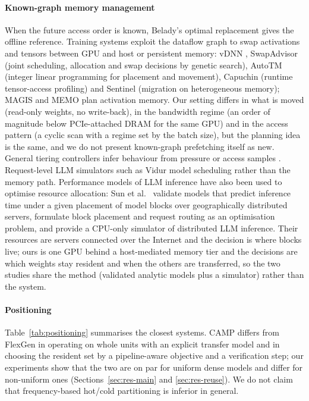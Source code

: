 \documentclass[preprint,12pt]{elsarticle}
\newcommand{\camp}{\textsc{CAMP}}
\begin{document}
\paragraph{Known-graph memory management}
When the future access order is known, Belady's optimal replacement \cite{belady1966study} gives the offline reference. Training systems exploit the dataflow graph to swap activations and tensors between GPU and host or persistent memory: vDNN \cite{rhu2016vdnn}, SwapAdvisor \cite{huang2020swapadvisor} (joint scheduling, allocation and swap decisions by genetic search), AutoTM \cite{hildebrand2020autotm} (integer linear programming for placement and movement), Capuchin \cite{peng2020capuchin} (runtime tensor-access profiling) and Sentinel \cite{ren2021sentinel} (migration on heterogeneous memory); MAGIS and MEMO \cite{chen2024magis,zhao2025memo} plan activation memory. Our setting differs in what is moved (read-only weights, no write-back), in the bandwidth regime (an order of magnitude below PCIe-attached DRAM for the same GPU) and in the access pattern (a cyclic scan with a regime set by the batch size), but the planning idea is the same, and we do not present known-graph prefetching itself as new. General tiering controllers infer behaviour from pressure or access samples \cite{tmo,limoncello}. Request-level LLM simulators such as Vidur \cite{agrawal2024vidur} model scheduling rather than the memory path. Performance models of LLM inference have also been used to optimise resource allocation: Sun et al.\ \cite{sun2025peva} validate models that predict inference time under a given placement of model blocks over geographically distributed servers, formulate block placement and request routing as an optimisation problem, and provide a CPU-only simulator of distributed LLM inference. Their resources are servers connected over the Internet and the decision is where blocks live; ours is one GPU behind a host-mediated memory tier and the decisions are which weights stay resident and when the others are transferred, so the two studies share the method (validated analytic models plus a simulator) rather than the system.

\paragraph{Positioning}
Table~\ref{tab:positioning} summarises the closest systems. \camp{} differs from FlexGen in operating on whole units with an explicit transfer model and in choosing the resident set by a pipeline-aware objective and a verification step; our experiments show that the two are on par for uniform dense models and differ for non-uniform ones (Sections~\ref{sec:res-main} and \ref{sec:res-reuse}). We do not claim that frequency-based hot/cold partitioning is inferior in general.
\end{document}
